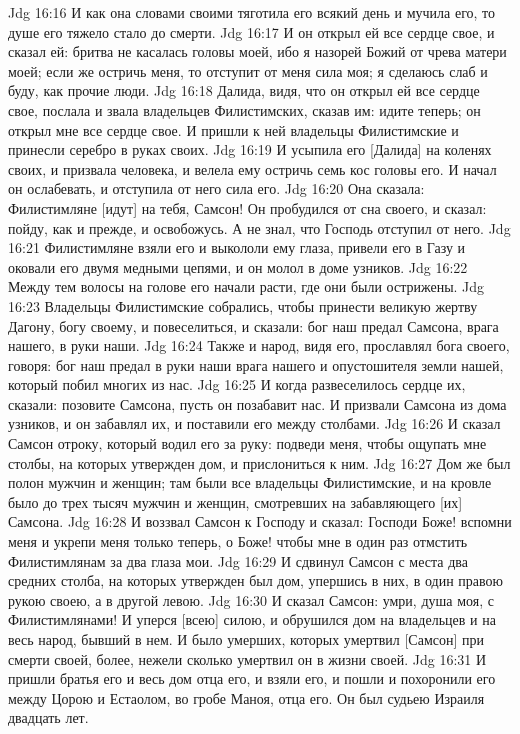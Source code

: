 Jdg 16:16  И как она словами своими тяготила его всякий день и мучила его, то душе его тяжело стало до смерти.
Jdg 16:17  И он открыл ей все сердце свое, и сказал ей: бритва не касалась головы моей, ибо я назорей Божий от чрева матери моей; если же остричь меня, то отступит от меня сила моя; я сделаюсь слаб и буду, как прочие люди.
Jdg 16:18  Далида, видя, что он открыл ей все сердце свое, послала и звала владельцев Филистимских, сказав им: идите теперь; он открыл мне все сердце свое. И пришли к ней владельцы Филистимские и принесли серебро в руках своих.
Jdg 16:19  И усыпила его [Далида] на коленях своих, и призвала человека, и велела ему остричь семь кос головы его. И начал он ослабевать, и отступила от него сила его.
Jdg 16:20  Она сказала: Филистимляне [идут] на тебя, Самсон! Он пробудился от сна своего, и сказал: пойду, как и прежде, и освобожусь. А не знал, что Господь отступил от него.
Jdg 16:21  Филистимляне взяли его и выкололи ему глаза, привели его в Газу и оковали его двумя медными цепями, и он молол в доме узников.
Jdg 16:22  Между тем волосы на голове его начали расти, где они были острижены.
Jdg 16:23  Владельцы Филистимские собрались, чтобы принести великую жертву Дагону, богу своему, и повеселиться, и сказали: бог наш предал Самсона, врага нашего, в руки наши.
Jdg 16:24  Также и народ, видя его, прославлял бога своего, говоря: бог наш предал в руки наши врага нашего и опустошителя земли нашей, который побил многих из нас.
Jdg 16:25  И когда развеселилось сердце их, сказали: позовите Самсона, пусть он позабавит нас. И призвали Самсона из дома узников, и он забавлял их, и поставили его между столбами.
Jdg 16:26  И сказал Самсон отроку, который водил его за руку: подведи меня, чтобы ощупать мне столбы, на которых утвержден дом, и прислониться к ним.
Jdg 16:27  Дом же был полон мужчин и женщин; там были все владельцы Филистимские, и на кровле было до трех тысяч мужчин и женщин, смотревших на забавляющего [их] Самсона.
Jdg 16:28  И воззвал Самсон к Господу и сказал: Господи Боже! вспомни меня и укрепи меня только теперь, о Боже! чтобы мне в один раз отмстить Филистимлянам за два глаза мои.
Jdg 16:29  И сдвинул Самсон с места два средних столба, на которых утвержден был дом, упершись в них, в один правою рукою своею, а в другой левою.
Jdg 16:30  И сказал Самсон: умри, душа моя, с Филистимлянами! И уперся [всею] силою, и обрушился дом на владельцев и на весь народ, бывший в нем. И было умерших, которых умертвил [Самсон] при смерти своей, более, нежели сколько умертвил он в жизни своей.
Jdg 16:31  И пришли братья его и весь дом отца его, и взяли его, и пошли и похоронили его между Цорою и Естаолом, во гробе Маноя, отца его. Он был судьею Израиля двадцать лет.
